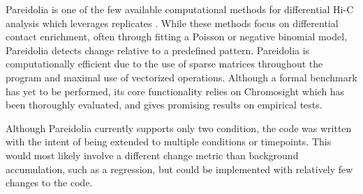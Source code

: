 Pareidolia is one of the few available computational methods for differential Hi-C analysis which leverages replicates \cite{lunDiffHicBioconductorPackage2015,stansfieldMultiHiCcompareJointNormalization2019,sahinHiCDCEnablesSystematic2021,djekidelFINDDifFerentialChromatin2018,cookMeasuringSignificantChanges2020}. While these methods focus on differential contact enrichment, often through fitting a Poisson or negative binomial model, Pareidolia detects change relative to a predefined pattern. Pareidolia is computationally efficient due to the use of sparse matrices throughout the program and maximal use of vectorized operations. Although a formal benchmark has yet to be performed, its core functionality relies on Chromosight which has been thoroughly evaluated, and gives promising results on empirical tests.

Although Pareidolia currently supports only two condition, the code was written with the intent of being extended to multiple conditions or timepoints. This would most likely involve a different change metric than background accumulation, such as a regression, but could be implemented with relatively few changes to the code.